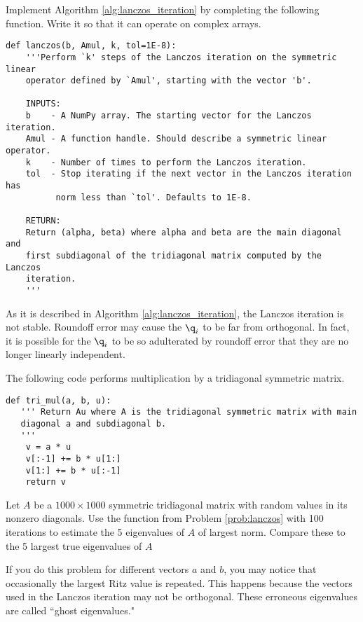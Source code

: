 \begin{problem}
\label{prob:lanczos}
Implement Algorithm \ref{alg:lanczos_iteration} by completing the following function.
Write it so that it can operate on complex arrays.
\begin{lstlisting}
def lanczos(b, Amul, k, tol=1E-8):
    '''Perform `k' steps of the Lanczos iteration on the symmetric linear 
    operator defined by `Amul', starting with the vector 'b'.
    
    INPUTS:
    b    - A NumPy array. The starting vector for the Lanczos iteration.
    Amul - A function handle. Should describe a symmetric linear operator.
    k    - Number of times to perform the Lanczos iteration.
    tol  - Stop iterating if the next vector in the Lanczos iteration has 
          norm less than `tol'. Defaults to 1E-8.
    
    RETURN:
    Return (alpha, beta) where alpha and beta are the main diagonal and 
    first subdiagonal of the tridiagonal matrix computed by the Lanczos 
    iteration.
    '''
\end{lstlisting}
\end{problem}

As it is described in Algorithm \ref{alg:lanczos_iteration}, the Lanczos iteration is not stable.
Roundoff error may cause the $\q_i$ to be far from orthogonal.
In fact, it is possible for the $\q_i$ to be so adulterated by roundoff error that they are no longer linearly independent.

\begin{problem}
The following code performs multiplication by a tridiagonal symmetric matrix.

\begin{lstlisting}
def tri_mul(a, b, u):
   ''' Return Au where A is the tridiagonal symmetric matrix with main
   diagonal a and subdiagonal b.
   '''
    v = a * u
    v[:-1] += b * u[1:]
    v[1:] += b * u[:-1]
    return v
\end{lstlisting}

Let $A$ be a $1000\times 1000$ symmetric tridiagonal matrix with random values in its nonzero diagonals.
Use the function  from Problem \ref{prob:lanczos} with 100 iterations to estimate the 5 eigenvalues of $A$ of largest norm.
Compare these to the 5 largest true eigenvalues of $A$

If you do this problem for different vectors $a$ and $b$, you may notice that occasionally the largest Ritz value is repeated.
This happens because the vectors used in the Lanczos iteration may not be orthogonal.
These erroneous eigenvalues are called ``ghost eigenvalues."
\end{problem}

